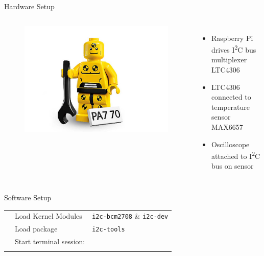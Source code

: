 \documentclass[]{beamer} %
\newcommand{\greenbullet}{\textcolor{bettergreen}\textbullet}
\newcommand{\twi}{I\textsuperscript{2}C\xspace}
\begin{document}
\begin{frame}{Hardware Setup}
	\begin{columns}
		\begin{figure}
			\includegraphics[width=0.9\linewidth]{dummy}
		\end{figure}
		\begin{itemize}
			\item Raspberry Pi drives \twi bus multiplexer LTC4306
			\item LTC4306 connected to temperature sensor MAX6657
			\item Oscilloscope attached to \twi bus on sensor
		\end{itemize}
	\end{columns}
\end{frame}

\begin{frame}{Software Setup}
	\begin{minipage}[c][.4\textheight][c]{\linewidth}
		\begin{tabular}{p{0.15cm} p{3.5cm} l}
			\greenbullet & Load Kernel Modules & \texttt{i2c-bcm2708} \& \texttt{i2c-dev}\\
			\greenbullet & Load package & \texttt{i2c-tools}\\
			\greenbullet & Start terminal session:\\
			\\
		\end{tabular}
	\end{minipage}
\end{frame}
\end{document}
